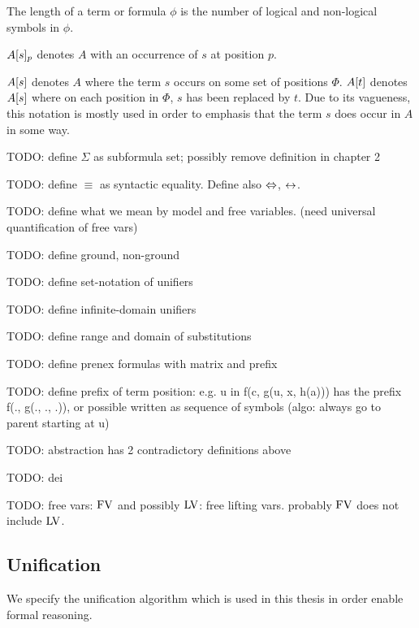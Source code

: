 The length of a term or formula $\phi$ is the number of logical and non-logical symbols in $\phi$.

$A{[s]_{p}}$ denotes $A$ with an occurrence of $s$ at position $p$.

$A[s]$ denotes $A$ where the term $s$ occurs on some set of positions $\Phi$. $A[t]$ denotes $A[s]$ where on each position in $\Phi$, $s$ has been replaced by $t$. Due to its vagueness, this notation is mostly used in order to emphasis that the term $s$ does occur in $A$ in some way.

TODO: define $\Sigma$ as subformula set; possibly remove definition in chapter 2

TODO: define $\equiv$ as syntactic equality. Define also $\operatorname{\Leftrightarrow}$, $\operatorname{\leftrightarrow}$.

TODO: define what we mean by model and free variables.
(need universal quantification of free vars)

TODO: define ground, non-ground

TODO: define set-notation of unifiers

TODO: define infinite-domain unifiers

TODO: define range and domain of substitutions

TODO: define prenex formulas with matrix and prefix

TODO: define prefix of term position: e.g. u in f(c, g(u, x, h(a))) has the prefix f(., g(., ., .)), or possible written as sequence of symbols (algo: always go to parent starting at u)

TODO: abstraction has 2 contradictory definitions above

TODO: dei

TODO: free vars: $\operatorname{FV}$ and possibly $\operatorname{LV}$: free lifting vars. probably $\operatorname{FV}$ does not include $\operatorname{LV}$.


\subsection{Unification}

We specify the unification algorithm which is used in this thesis in order enable formal reasoning.

